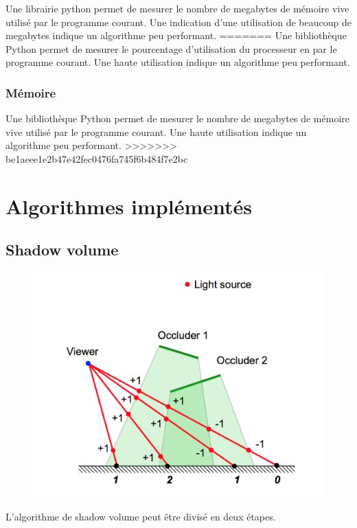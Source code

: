 \documentclass[a4paper,10pt]{report}
\begin{document}
Une librairie python permet de mesurer le nombre de megabytes de mémoire vive utilisé par le programme courant. Une indication d'une utilisation de beaucoup de megabytes indique un algorithme peu performant.
=======
Une bibliothèque Python permet de mesurer le pourcentage d'utilisation du processeur en par le programme courant. Une haute utilisation indique un algorithme peu performant.
\subsubsection{Mémoire}

Une bibliothèque Python permet de mesurer le nombre de megabytes de mémoire vive utilisé par le programme courant. Une haute utilisation indique un algorithme peu performant.
>>>>>>> be1aeee1e2b47e42fec0476fa745f6b484f7e2bc

\section{Algorithmes implémentés} 

\subsection{Shadow volume}

\begin{figure}[H]
\includegraphics[scale=0.32]{images/shadow_volume.png}
\centering
{}
\end{figure}
L'algorithme de shadow volume peut être divisé en deux étapes.
\end{document}
